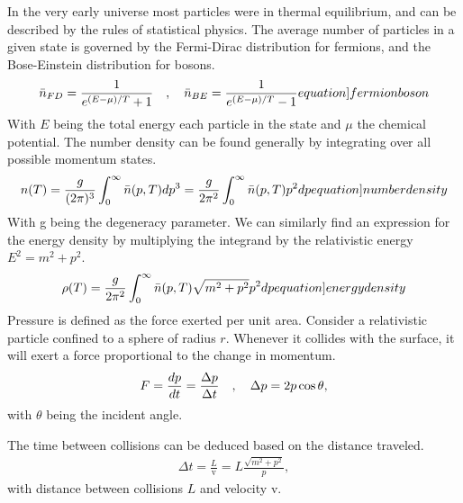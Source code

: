 In the very early universe most particles were in thermal equilibrium, and can be described by the rules of statistical physics. The average number of particles in a given state is governed by the Fermi-Dirac distribution for fermions, and the Bose-Einstein distribution for bosons.
\begin{align}
    \bar{n}_{FD}=\frac{1}{e^{(E-\mu)/T}+1} \eqsep   \bar{n}_{BE}=\frac{1}{e^{(E-\mu)/T}-1}
    \label[equation]{fermionboson}
\end{align}
With $E$ being the total energy each particle in the state and $\mu$ the chemical potential. The number density can be found generally by integrating over all possible momentum states. 
\begin{align}
    n(T)=\frac{g}{(2\pi)^3}\int_{0}^{\infty}\bar{n}(p,T)dp^3=\frac{g}{2\pi^2}\int_{0}^{\infty}\bar{n}(p,T) p^2 dp
    \label[equation]{numberdensity}
\end{align}
With g being the degeneracy parameter. We can similarly find an expression for the energy density by multiplying the integrand by the relativistic energy $E^2=m^2+p^2$.
\begin{align}
    \rho(T)=\frac{g}{2\pi^2}\int_{0}^{\infty}\bar{n}(p,T)\sqrt{m^2+p^2} p^2 dp
    \label[equation]{energydensity}
\end{align}
Pressure is defined as the force exerted per unit area. Consider a relativistic particle confined to a sphere of radius $r$. Whenever it collides with the surface, it will exert a force proportional to the change in momentum. 
\begin{align}
    F=\frac{dp}{dt}=\frac{\Delta p }{\Delta t}\quad , \quad
    \Delta p = 2p \cos \theta,
\end{align}
with $\theta$ being the incident angle. 

The time between collisions can be deduced based on the distance traveled. 
\begin{align}
    \Delta t = \frac{L}{\mathrm{v}}=L\frac{\sqrt{m^2+p^2}}{p},
\end{align}
with distance between collisions $L$ and velocity $\mathrm{v}$.

